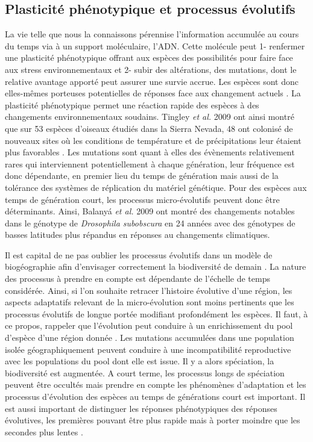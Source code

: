 \subsection{Plasticité phénotypique et processus évolutifs}

La vie telle que nous la connaissons pérennise l'information accumulée
au cours du temps via à un support moléculaire, l'ADN. Cette molécule
peut 1- renfermer une plasticité phénotypique offrant aux espèces des
possibilités pour faire face aux stress environnementaux et 2- subir des
altérations, des mutations, dont le relative avantage apporté peut
assurer une survie accrue. Les espèces sont donc elles-mêmes porteuses
potentielles de réponses face aux changement actuels
\cite{Parmesan2006,Lavergne2010}. La plasticité phénotypique permet une
réaction rapide des espèces à des changements environnementaux soudains.
Tingley \textit{et al.} 2009 ont ainsi montré que sur 53 espèces
d'oiseaux étudiés dans la Sierra Nevada, 48 ont colonisé de nouveaux
sites où les conditions de température et de précipitations leur étaient
plus favorables \cite{Tingley2009}. Les mutations sont quant à elles des
évènements relativement rares qui interviennent potentiellement à chaque
génération, leur fréquence est donc dépendante, en premier lieu du temps
de génération mais aussi de la tolérance des systèmes de réplication du
matériel génétique. Pour des espèces aux temps de génération court, les
processus micro-évolutifs peuvent donc être déterminants. Ainsi, Balanyá
\textit{et al.} 2009 ont montré des changements notables dans le
génotype de \textit{Drosophila subobscura} en 24 années avec des
génotypes de basses latitudes plus répandus en réponses au changements
climatiques.

Il est capital de ne pas oublier les processus évolutifs dans un modèle
de biogéographie afin d'envisager correctement la biodiversité de demain
\cite{Sexton2009,Lavergne2010}. La nature des processus à prendre en
compte est dépendante de l'échelle de temps considérée. Ainsi, si l'on
souhaite retracer l'histoire évolutive d'une région, les aspects
adaptatifs relevant de la micro-évolution sont moins pertinents que les
processus évolutifs de longue portée modifiant profondément les espèces.
Il faut, à ce propos, rappeler que l'évolution peut conduire à un
enrichissement du pool d'espèce d'une région donnée
\cite{Rosindell2011,MacArthur1967}. Les mutations accumulées dans une
population isolée géographiquement peuvent conduire à une
incompatibilité reproductive avec les populations du pool dont elle est
issue. Il y a alors spéciation, la biodiversité est augmentée. A court
terme, les processus longs de spéciation peuvent être occultés mais
prendre en compte les phénomènes d'adaptation et les processus
d'évolution des espèces au temps de générations court est important. Il
est aussi important de distinguer les réponses phénotypiques des
réponses évolutives, les premières pouvant être plus rapide mais à
porter moindre que les secondes plus lentes \cite{Gienapp2008}.

